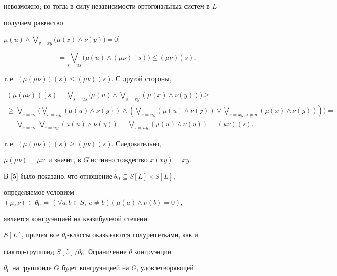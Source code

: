 невозможно; но тогда в силу независимости ортогональных систем в $L$


получаем равенство


$\mu(u)\wedge\bigvee\limits_{v=xy}\big(\mu(x)\wedge\nu(y)\big)=0$]


$$


=\bigvee_{s=us}\big(\mu(u)\wedge(\mu\nu)(s)\big)\leqslant(\mu\nu)(s),


$$


т.\,е. $(\mu(\mu\nu))(s)\leqslant (\mu\nu)(s)$. С другой стороны,


\begin{multline*}


(\mu(\mu\nu))(s)=\bigvee_{s=us}\bigg(\mu(u)\wedge\bigvee_{s=xy}(\mu(x)


\wedge\nu(y))\bigg)\geqslant \\


%


\geqslant\bigvee_{s=us}\bigg(\bigvee_{s=uy}(\mu(u)


\wedge\nu(y))\wedge(\bigvee_{s=uy}(\mu(u)\wedge\nu(y))


\vee\bigvee_{s=xy,x\ne u}(\mu(x)\wedge\nu(y)))\bigg)= \\


%


=\bigvee_{s=us}\bigvee_{s=uy}(\mu(u)\wedge\nu(y))=


\bigvee_{s=uy}(\mu(u)\wedge\nu(y))=(\mu\nu)(s),


\end{multline*}


т.\,е. $(\mu(\mu\nu))(s)\geqslant(\mu\nu)(s)$. Следовательно,


$\mu(\mu\nu)=\mu\nu$, и значит, в $G$ истинно тождество $x(xy)=xy$.





В [5] было показано, что отношение $\theta_0\subseteq S[L]\times S[L]$,


определяемое условием $(\mu,\nu)\in\theta_0\Longleftrightarrow


(\forall a,b\in S,\ a\ne b)(\mu(a)\wedge\nu(b)=0)$,


является конгруэнцией на квазибулевой степени


$S[L]$, причем все $\theta_0$-классы оказываются полурешетками, как и


фактор-группоид $S[L]/\theta_0$. Ограничение $\theta$ конгруэнции


$\theta_0$ на группоиде $G$ будет конгруэнцией на $G$, удовлетворяющей


